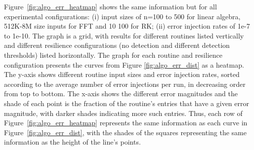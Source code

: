 \documentclass{sig-alternate}
\newcommand{\sui}[1]{%
  \textcolor{green}{SC - #1}
}
\newcommand{\greg}[1]{%
  \textcolor{blue}{GB: #1}
}
\begin{document}
Figure~\ref{fig:algo_err_heatmap} shows the same information but for all experimental configurations: (i) input sizes of n=100 to 500 for linear algebra, 512K-8M size inputs for FFT and 10 100 for RK; (ii) error injection rates of 1e-7 to 1e-10.
The graph is a grid, with results for different routines listed vertically and different resilience configurations (no detection and different detection thresholds) listed horizontally.
The graph for each routine and resilience configuration presents the curves from Figure \ref{fig:algo_err_dist} as a heatmap.
The y-axis shows different routine input sizes and error injection rates, sorted according to the average number of error injections per run, in decreasing order from top to bottom.
The x-axis shows the different error magnitudes and the shade of each point is the fraction of the routine's entries that have a given error magnitude, with darker shades indicating more such entries.
Thus, each row of Figure~\ref{fig:algo_err_heatmap} represents the same information as each curve in Figure~\ref{fig:algo_err_dist}, with the shades of the squares representing the same information as the height of the line's points.

\end{document}
